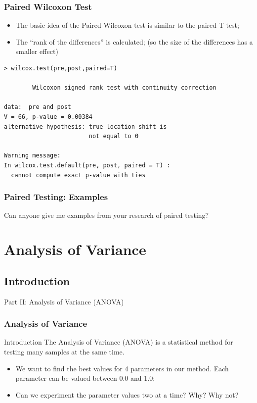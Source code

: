 \documentclass[10pt]{beamer}
\begin{document}
\begin{frame}
  \frametitle{Paired Wilcoxon Test}
  \begin{itemize}
  \item The basic idea of the Paired Wilcoxon test is similar to the paired T-test;
  \item The ``rank of the differences'' is calculated; (so the size of the differences has a smaller effect)
  \end{itemize}
  \begin{block}{}
{\small
\begin{verbatim}
> wilcox.test(pre,post,paired=T)

        Wilcoxon signed rank test with continuity correction

data:  pre and post 
V = 66, p-value = 0.00384
alternative hypothesis: true location shift is 
                        not equal to 0 

Warning message:
In wilcox.test.default(pre, post, paired = T) :
  cannot compute exact p-value with ties
\end{verbatim}}
  \end{block}
\end{frame}

\begin{frame}
  \frametitle{Paired Testing: Examples}
  Can anyone give me examples from your research of paired testing?
\end{frame}



\section{Analysis of Variance} %
\subsection{Introduction}

\begin{frame}
  \begin{center}
    Part II: Analysis of Variance (ANOVA)
  \end{center}
\end{frame}

\begin{frame}
  \frametitle{Analysis of Variance}
  \begin{block}{Introduction}
    The Analysis of Variance (ANOVA) is a statistical method for
    testing many samples at the same time.
  \end{block}
  \begin{itemize}
  \item We want to find the best values for 4 parameters in our
    method. Each parameter can be valued between 0.0 and 1.0;
  \item Can we experiment the parameter values two at a time? Why? Why
    not?
  \end{itemize}
\end{frame}
\end{document}
